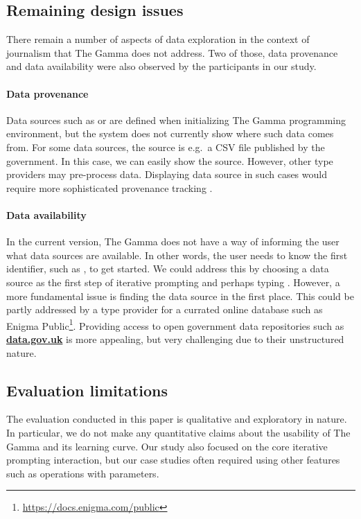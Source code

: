\documentclass[manuscript,review,anonymous]{acmart}
\begin{document}
\subsection{Remaining design issues}
There remain a number of aspects of data exploration in the context of journalism that
The Gamma does not address. Two of those, data provenance and data availability were also
observed by the participants in our study.

\paragraph{Data provenance}
Data sources such as  or  are defined when initializing The Gamma
programming environment, but the system does not currently show where such data comes from.
For some data sources, the source is e.g.~a CSV file published by the government. In this case,
we can easily show the source. However, other type providers may pre-process data. Displaying
data source in such cases would require more sophisticated provenance tracking \cite{provenance}.

\paragraph{Data availability}
In the current version, The Gamma does not have a way of informing the user what data sources
are available. In other words, the user needs to know the first identifier, such as ,
to get started. We could address this by choosing a data source as the first step of iterative
prompting and perhaps typing . However, a more fundamental issue is finding
the data source in the first place. This could be partly addressed by a type provider for a
currated online database such as Enigma Public\footnote{\url{https://docs.enigma.com/public}}.
Providing access to open government data repositories such as \href{http://data.gov.uk}{\small\bf\ttfamily data.gov.uk}
is more appealing, but very challenging due to their unstructured nature.

\subsection{Evaluation limitations}
The evaluation conducted in this paper is qualitative and exploratory in nature. In particular,
we do not make any quantitative claims about the usability of The Gamma and its learning curve.
Our study also focused on the core iterative prompting interaction, but our case studies often
required using other features such as operations with parameters.
\end{document}
